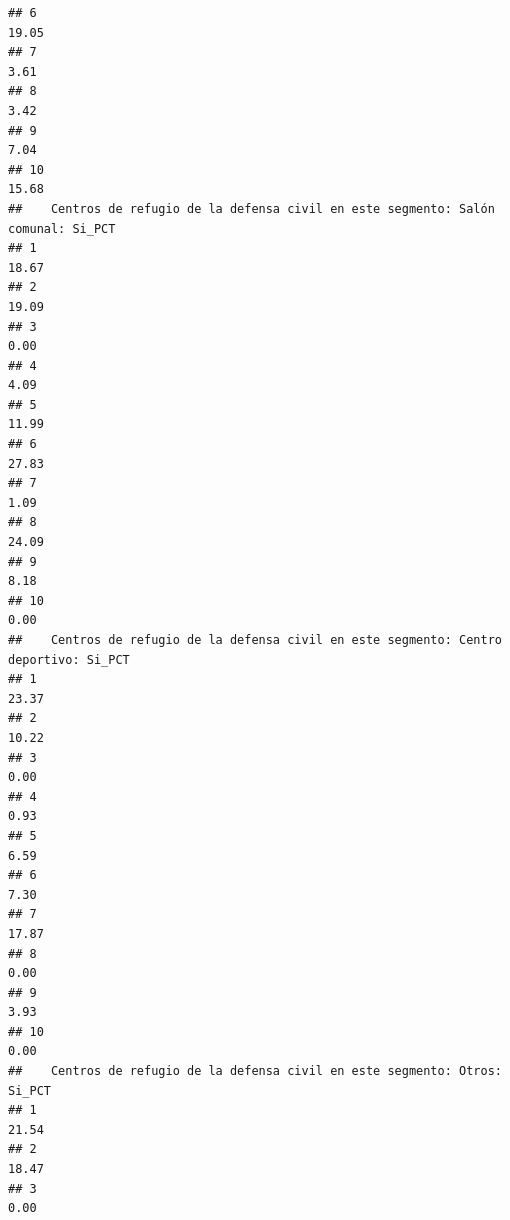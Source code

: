 \documentclass[11pt,]{article}
\begin{document}
\begin{verbatim}
## 6                                                                     19.05
## 7                                                                      3.61
## 8                                                                      3.42
## 9                                                                      7.04
## 10                                                                    15.68
##    Centros de refugio de la defensa civil en este segmento: Salón comunal: Si_PCT
## 1                                                                           18.67
## 2                                                                           19.09
## 3                                                                            0.00
## 4                                                                            4.09
## 5                                                                           11.99
## 6                                                                           27.83
## 7                                                                            1.09
## 8                                                                           24.09
## 9                                                                            8.18
## 10                                                                           0.00
##    Centros de refugio de la defensa civil en este segmento: Centro deportivo: Si_PCT
## 1                                                                              23.37
## 2                                                                              10.22
## 3                                                                               0.00
## 4                                                                               0.93
## 5                                                                               6.59
## 6                                                                               7.30
## 7                                                                              17.87
## 8                                                                               0.00
## 9                                                                               3.93
## 10                                                                              0.00
##    Centros de refugio de la defensa civil en este segmento: Otros: Si_PCT
## 1                                                                   21.54
## 2                                                                   18.47
## 3                                                                    0.00

\end{verbatim}
\end{document}
